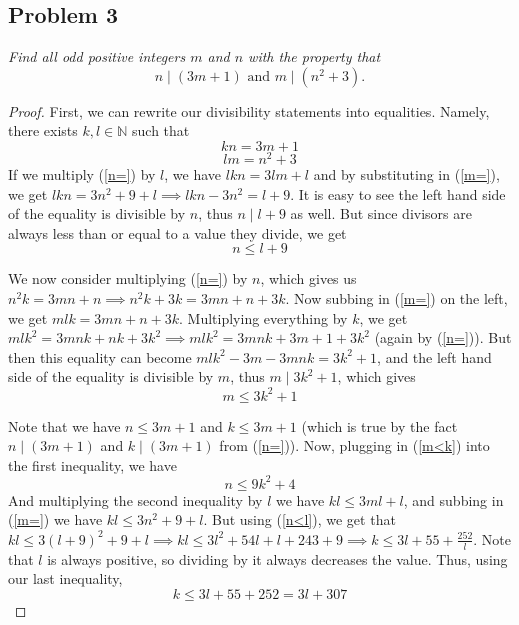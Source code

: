 \documentclass{article}
\newcommand{\N}{{\mathbb N}}
\begin{document}
\subsection*{Problem 3}
{\it Find all odd positive integers $m$ and $n$ with the property that
\[n \mid (3m+1) \text{ and } m \mid (n^2 + 3).\]}

\begin{proof}
	First, we can rewrite our divisibility statements into equalities.
	Namely, there exists $k,l \in \N$ such that
	\begin{equation}\label{n=}
		kn = 3m + 1
	\end{equation}
	\begin{equation}\label{m=}
		lm = n^2 + 3
	\end{equation}
	If we multiply (\ref{n=}) by $l$, we have $lkn = 3lm + l$
	and by substituting in (\ref{m=}), we get
	$lkn = 3n^2 + 9 + l \implies lkn - 3n^2 = l + 9$.
	It is easy to see the left hand side of the equality is divisible by $n$,
	thus $n \mid l + 9$ as well.
	But since divisors are always less than or equal to a value they divide,
	we get
	\begin{equation}\label{n<l}
		n \leq l + 9
	\end{equation}
	
	We now consider multiplying (\ref{n=}) by $n$,
	which gives us $n^2k = 3mn + n \implies n^2k+3k = 3mn + n + 3k$.
	Now subbing in (\ref{m=}) on the left, we get $mlk = 3mn + n + 3k$.
	Multiplying everything by $k$, we get
	$mlk^2 = 3mnk + nk + 3k^2 \implies mlk^2 = 3mnk + 3m + 1 + 3k^2$ (again by (\ref{n=})).
	But then this equality can become $mlk^2 - 3m - 3mnk = 3k^2 + 1$,
	and the left hand side of the equality is divisible by $m$,
	thus $m \mid 3k^2 + 1$, which gives
	\begin{equation}\label{m<k}
		m \leq 3k^2 + 1
	\end{equation}
	
	Note that we have $n \leq 3m + 1$ and $k \leq 3m + 1$
	(which is true by the fact $n \mid (3m+1)$ and $k \mid (3m+1)$ from (\ref{n=})).
	Now, plugging in (\ref{m<k}) into the first inequality, we have
	\begin{equation}\label{n<k}
		n \leq 9k^2 + 4
	\end{equation}
	And multiplying the second inequality by $l$ we have $kl \leq 3ml + l$,
	and subbing in (\ref{m=}) we have $kl \leq 3n^2 + 9 + l$.
	But using (\ref{n<l}), we get that $kl \leq 3(l+9)^2 + 9 + l
	\implies kl \leq 3l^2 + 54l + l + 243 + 9
	\implies k \leq 3l + 55 + \frac{252}{l}$.
	Note that $l$ is always positive, so dividing by it always decreases the value.
	Thus, using our last inequality,
	\begin{equation}\label{k<l}
		k \leq 3l + 55 + 252 = 3l + 307
	\end{equation}
	

\end{proof}
\end{document}
